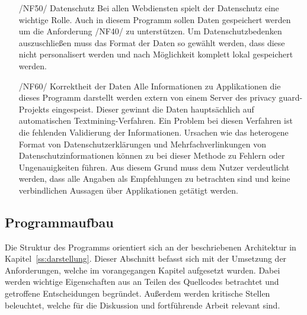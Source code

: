 \begin{itemize}
	\item[/NF50/] Datenschutz
	Bei allen Webdiensten spielt der Datenschutz eine wichtige Rolle. Auch in diesem Programm sollen Daten gespeichert werden um die Anforderung /NF40/ zu unterstützen. Um Datenschutzbedenken auszuschließen muss das Format der Daten so gewählt werden, dass diese nicht personalisert werden und nach Möglichkeit komplett lokal gespeichert werden.
	\item[/NF60/] Korrektheit der Daten
	Alle Informationen zu Applikationen die dieses Programm darstellt werden extern von einem Server des privacy guard-Projekts eingespeist. Dieser gewinnt die Daten hauptsächlich auf automatischen Textmining-Verfahren. Ein Problem bei diesen Verfahren ist die fehlenden Validierung der Informationen. Ursachen wie das heterogene Format von Datenschutzerklärungen und Mehrfachverlinkungen von Datenschutzinformationen können zu bei dieser Methode zu Fehlern oder Ungenauigkeiten führen. Aus diesem Grund muss dem Nutzer verdeutlicht werden, dass alle Angaben als Empfehlungen zu betrachten sind und keine verbindlichen Aussagen über Applikationen getätigt werden.
\end{itemize}

\subsection{Programmaufbau}
\label{ss:programmaufbau}
Die Struktur des Programms orientiert sich an der beschriebenen Architektur in Kapitel~\ref{ss:darstellung}. Dieser Abschnitt befasst sich mit der Umsetzung der Anforderungen, welche im vorangegangen Kapitel aufgesetzt wurden. Dabei werden wichtige Eigenschaften aus an Teilen des Quellcodes betrachtet und getroffene Entscheidungen begründet. Außerdem werden kritische Stellen beleuchtet, welche für die Diskussion und fortführende Arbeit relevant sind.




